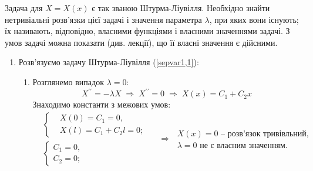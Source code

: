Задача для $X = X(x)$ є так званою Штурма-Ліувілля. Необхідно знайти нетривіальні розв'язки цієї задачі і значення параметра   $\lambda$, при яких вони існують; їх називають, відповідно, власними функціями і власними значеннями задачі. З умов задачі можна показати (див. лекції), що її власні значення є дійсними.\\
\begin{enumerate}
    \item[] Розв'язуємо задачу Штурма-Ліувілля (\ref{sepvar1,1}):
    \begin{enumerate}[wide, labelindent=0pt]
        \item Розглянемо випадок $\lambda = 0$:
        \begin{equation*}
            X^{\prime\prime} = -\lambda X
            \;\Rightarrow\;
            X^{\prime\prime} = 0
            \;\Rightarrow\;
            X(x) = C_1 + C_2 x
        \end{equation*}
        Знаходимо константи з межових умов:
        \begin{equation*}
            \begin{aligned}
                &\left\{ \begin{aligned}
                    &X(0) = C_1 = 0, \\ 
                    &X(l) = C_1 + C_2 l = 0;
                \end{aligned} \right.
                \\   
                &\left\{ \begin{aligned}
                    C_1 = 0, \\ 
                    C_2 = 0;
                \end{aligned} \right.
            \end{aligned}
            \quad\Rightarrow\;
            \begin{aligned}
                X(x) = 0 \text{ -- розв'язок тривівльний,}\\
                \lambda = 0 \text{ не є власним значенням.}
            \end{aligned}
        \end{equation*}
    

\end{enumerate}
\end{enumerate}
